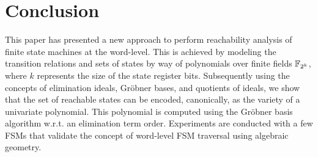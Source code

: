 
\section{Conclusion} \label{sec:conc}
This paper has presented a new approach to perform reachability
analysis of finite state machines at the word-level. This is achieved
by modeling the transition relations and sets of states by way of
polynomials over finite fields ${\mathbb{F}}_{2^k}$, where $k$ represents the size
of the state register bits. Subsequently using the concepts of
elimination ideals, Gr\"obner bases, and quotients of ideals, we show
that the set of reachable states can be encoded, canonically, as the
variety of a univariate polynomial. This polynomial is computed using
the Gr\"obner basis algorithm w.r.t. an elimination term
order. Experiments are conducted with a few FSMs that validate the
concept of word-level FSM traversal using algebraic geometry. 
